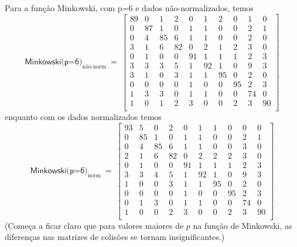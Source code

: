 \documentclass[10pt,a4paper,twocolumn]{article}
\begin{document}
      Para a função Minkowski, com p=6 e dados não-normalizados, temos
      \begin{equation*}
        \textsf{Minkowski(p=6)}_\text{não-norm}~=~ \left [
        \begin{smallmatrix}
          89 &  0 &  1 &  2 &  0 &  1 &  2 &  0 &  1 &  0 \\
           0 & 87 &  1 &  0 &  1 &  1 &  0 &  0 &  2 &  1 \\ 
           0 &  4 & 85 &  6 &  1 &  1 &  0 &  0 &  2 &  0 \\ 
           3 &  1 &  6 & 82 &  0 &  2 &  1 &  2 &  3 &  0 \\ 
           0 &  1 &  0 &  0 & 91 &  1 &  1 &  1 &  2 &  3 \\ 
           3 &  3 &  3 &  5 &  1 & 92 &  1 &  0 &  9 &  3 \\ 
           3 &  1 &  0 &  3 &  1 &  1 & 95 &  0 &  2 &  0 \\ 
           0 &  0 &  0 &  0 &  1 &  0 &  0 & 95 &  2 &  3 \\ 
           1 &  3 &  3 &  0 &  1 &  1 &  0 &  0 & 74 &  0 \\ 
           1 &  0 &  1 &  2 &  3 &  0 &  0 &  2 &  3 & 90 \\ 
        \end{smallmatrix} \right ]
      \end{equation*}
      enquanto com os dados normalizados temos
      \begin{equation*}
        \textsf{Minkowski(p=6)}_\text{norm}~=~ \left [
        \begin{smallmatrix}
          93 &  5 &  0 &  2 &  0 &  1 &  1 &  0 &  0 &  0 \\
           0 & 85 &  1 &  0 &  1 &  1 &  0 &  0 &  2 &  1 \\ 
           0 &  4 & 85 &  6 &  1 &  1 &  0 &  0 &  3 &  0 \\ 
           2 &  1 &  6 & 82 &  0 &  2 &  2 &  2 &  3 &  0 \\ 
           0 &  1 &  0 &  0 & 91 &  1 &  1 &  1 &  2 &  3 \\ 
           3 &  3 &  4 &  5 &  1 & 92 &  1 &  0 &  9 &  3 \\ 
           1 &  0 &  0 &  3 &  1 &  1 & 95 &  0 &  2 &  0 \\ 
           0 &  0 &  0 &  0 &  1 &  0 &  0 & 95 &  2 &  3 \\ 
           0 &  1 &  3 &  0 &  1 &  1 &  0 &  0 & 74 &  0 \\ 
           1 &  0 &  0 &  2 &  3 &  0 &  0 &  2 &  3 & 90 \\ 
        \end{smallmatrix} \right ]
      \end{equation*}
      (Começa a ficar claro que para valores maiores de $p$ na função de
      Minkowski, as diferenças nas matrizes de colisões se tornam 
      insignificantes.)
\end{document}
